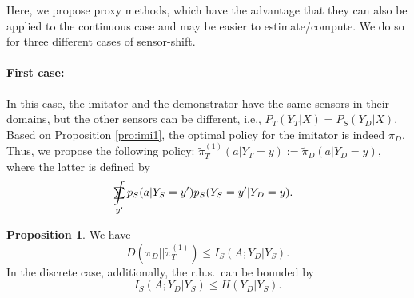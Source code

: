\documentclass[letterpaper]{article} %
\theoremstyle{definition}%
\theoremstyle{definition}
\newtheorem{proposition}{Proposition}
\newcommand{\Obs}{Y}
\newcommand{\obs}{y}
\newcommand{\todo}[1]{\textcolor{red}{#1}}
\DeclareMathOperator*{\SumInt}{%
	\mathchoice%
	{\ooalign{$\sum$\cr\hidewidth$\displaystyle\int$\hidewidth\cr}}
	{\ooalign{\raisebox{.14\height}{\scalebox{.7}{$\textstyle\sum$}}\cr\hidewidth$\textstyle\int$\hidewidth\cr}}
	{\ooalign{\raisebox{.2\height}{\scalebox{.6}{$\scriptstyle\sum$}}\cr$\scriptstyle\int$\cr}}
	{\ooalign{\raisebox{.2\height}{\scalebox{.6}{$\scriptstyle\sum$}}\cr$\scriptstyle\int$\cr}}
}
\begin{document}
Here, we propose proxy methods, which have the advantage that they can also be applied to the continuous case and may be easier to estimate/compute.
We do so for three different cases of sensor-shift. %

\paragraph{First case:}
In this case, the imitator and the demonstrator have the same sensors in their domains, but the other sensors can be different, i.e., $P_T(\Obs_T|X)=P_S(\Obs_D|X)$.
Based on  Proposition \ref{pro:imi1}, the optimal policy for the imitator is indeed $\pi_D$. Thus, we propose the following policy: $\tilde{\pi}^{(1)}_T(a | Y_T=y):=\tilde{\pi}_D(a|\Obs_D=y)$, where the latter is defined by

\begin{align}\label{eq:proxy_2}
&\SumInt_{\obs'} p_S(a|\Obs_S=y')p_S(\Obs_S=y'|\Obs_D=y).
\end{align}

\begin{proposition}\label{pro:imi2}
We have
$$
D( {\pi}_D|| \tilde{\pi}^{(1)}_T)\leq I_S(A;\Obs_D|\Obs_S).
$$
In the discrete case, additionally, the r.h.s.\ can be bounded by
$$
I_S(A;\Obs_D|\Obs_S)\leq H(\Obs_D|\Obs_S).
$$
\end{proposition}
\end{document}

